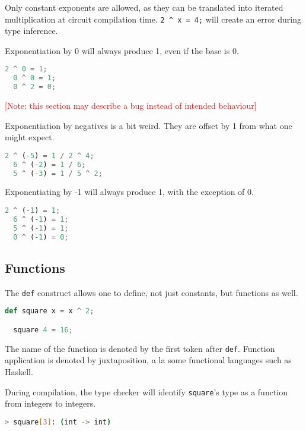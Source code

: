 Only constant exponents are allowed, as they can be translated into iterated multiplication at circuit compilation time. \lstinline{2 ^ x = 4;} will create an error during type inference.

Exponentiation by 0 will always produce 1, even if the base is 0.

\begin{lstlisting}[language=Python]
  2 ^ 0 = 1;
  0 ^ 0 = 1;
  0 ^ 2 = 0;
\end{lstlisting}

\textcolor{red}{[Note: this section may describe a bug instead of intended behaviour]}

Exponentiation by negatives is a bit weird. They are offset by 1 from what one might expect.

\begin{lstlisting}[language=Python]
  2 ^ (-5) = 1 / 2 ^ 4;
  6 ^ (-2) = 1 / 6;
  5 ^ (-3) = 1 / 5 ^ 2;
\end{lstlisting}

Exponentiating by -1 will always produce 1, with the exception of 0.

\begin{lstlisting}[language=Python]
  2 ^ (-1) = 1;
  6 ^ (-1) = 1;
  5 ^ (-1) = 1;
  0 ^ (-1) = 0;
\end{lstlisting}

\subsection{Functions} \label{FUN}

The \lstinline{def} construct allows one to define, not just constants, but functions as well.

\begin{lstlisting}[language=Python]
  def square x = x ^ 2;

  square 4 = 16;
\end{lstlisting}

The name of the function is denoted by the first token after \lstinline{def}. Function application is denoted by juxtaposition, a la some functional languages such as Haskell.

During compilation, the type checker will identify \lstinline{square}'s type as a function from integers to integers.

\begin{lstlisting}[language=bash]
  > square[3]: (int -> int)
\end{lstlisting}

